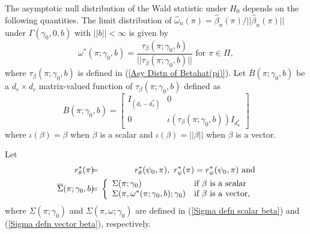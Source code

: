 \documentclass[12pt,thmsb,titlepage,final,oneside,letterpaper]{article}
\begin{document}
\hspace{0.25in}The asymptotic null distribution of the Wald statistic under $%
H_{0}$ depends on the following quantities. The limit distribution of $%
\widehat{\omega }_{n}(\pi )=\widehat{\beta }_{n}(\pi )/||\widehat{\beta }%
_{n}(\pi )||$ under $\Gamma (\gamma _{0},0,b)$ with $||b||<\infty $ is given
by%
\begin{equation}
\omega ^{\ast }(\pi ;\gamma _{0},b)=\frac{\tau _{\beta }(\pi ;\gamma _{0},b)%
}{||\tau _{\beta }(\pi ;\gamma _{0},b)||}\text{ for }\pi \in \Pi ,
\label{Omegastar defn}
\end{equation}%
where $\tau _{\beta }(\pi ;\gamma _{0},b)$ is defined in (\ref{Asy Distn of
Betahat(pi)}). Let $\overline{B}(\pi ;\gamma _{0},b)$ be a $d_{r}\times
d_{r} $ matrix-valued function of $\tau _{\beta }(\pi ;\gamma _{0},b)$
defined as%
\begin{equation}
\overline{B}(\pi ;\gamma _{0},b)=\left[ 
\begin{array}{cc}
I_{(d_{r}-d_{\pi }^{\ast })} & 0 \\ 
0 & \iota (\tau _{\beta }(\pi ;\gamma _{0},b))I_{d_{\pi }^{\ast }}%
\end{array}%
\right]
\end{equation}%
where $\iota (\beta )=\beta $ when $\beta $ is a scalar and $\iota (\beta
)=||\beta ||$ when $\beta $ is a vector.

Let%
\begin{eqnarray}
r_{\theta }^{\ast }(\pi )\hspace{-0.08in} &=&\hspace{-0.08in}r_{\theta
}^{\ast }(\psi _{0},\pi ),\text{ }r_{\psi }^{\ast }(\pi )=r_{\psi }^{\ast
}(\psi _{0},\pi )\text{ and}  \notag \\
\overline{\Sigma }(\pi ;\gamma _{0},b)\hspace{-0.08in} &=&\hspace{-0.08in}%
\left\{ 
\begin{array}{ll}
\Sigma (\pi ;\gamma _{0}) & \text{if }\beta \text{ is a scalar} \\ 
\Sigma (\pi ,\omega ^{\ast }(\pi ;\gamma _{0},b);\gamma _{0}) & \text{if }%
\beta \text{ is a vector,}%
\end{array}%
\right.  \label{Sigmabar defn}
\end{eqnarray}%
where $\Sigma (\pi ;\gamma _{0})$ and $\Sigma (\pi ,\omega ;\gamma _{0})$
are defined in (\ref{Sigma defn scalar beta}) and (\ref{Sigma defn vector
beta}), respectively.
\end{document}
